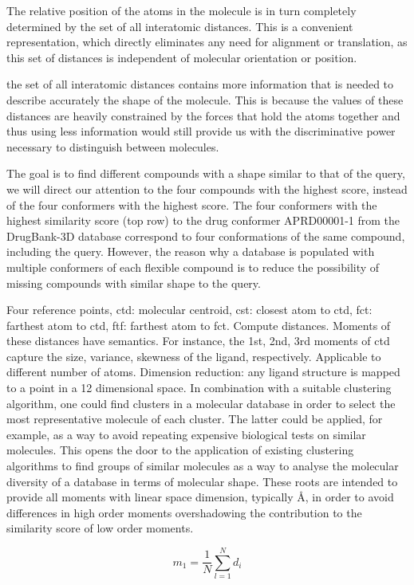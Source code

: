 The relative position of the atoms in the molecule is in turn completely determined by the set of all interatomic distances. This is a convenient representation, which directly eliminates any need for alignment or translation, as this set of distances is independent of molecular orientation or position.

the set of all interatomic distances contains more information that is needed to describe accurately the shape of the molecule. This is because the values of these distances are heavily constrained by the forces that hold the atoms together and thus using less information would still provide us with the discriminative power necessary to distinguish between molecules.

The goal is to find different compounds with a shape similar to that of the query, we will direct our attention to the four compounds with the highest score, instead of the four conformers with the highest score. The four conformers with the highest similarity score (top row) to the drug conformer APRD00001-1 from the DrugBank-3D database correspond to four conformations of the same compound, including the query. However, the reason why a database is populated with multiple conformers of each flexible compound is to reduce the possibility of missing compounds with similar shape to the query.

Four reference points, ctd: molecular centroid, cst: closest atom to ctd, fct: farthest atom to ctd, ftf: farthest atom to fct. Compute distances. Moments of these distances have semantics. For instance, the 1st, 2nd, 3rd moments of ctd capture the size, variance, skewness of the ligand, respectively. Applicable to different number of atoms. Dimension reduction: any ligand structure is mapped to a point in a 12 dimensional space. In combination with a suitable clustering algorithm, one could find clusters in a molecular database in order to select the most representative molecule of each cluster. The latter could be applied, for example, as a way to avoid repeating expensive biological tests on similar molecules.  This opens the door to the application of existing clustering algorithms to find groups of similar molecules as a way to analyse the molecular diversity of a database in terms of molecular shape. These roots are intended to provide all moments with linear space dimension, typically \AA, in order to avoid differences in high order moments overshadowing the contribution to the similarity score of low order moments.

\begin{equation}
m_1=\frac{1}{N}\sum_{l=1}^{N}d_i
\label{eqn:moment1}
\end{equation}


